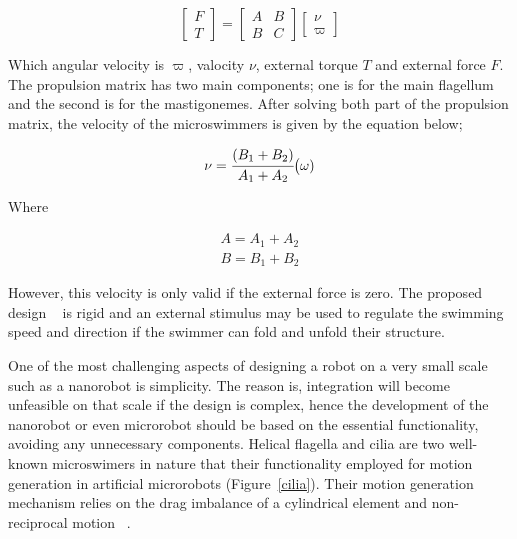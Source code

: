 \documentclass[a4paper,11pt]{article}
\begin{document}
\begin{sloppypar}
\[
\begin{bmatrix} F\\ 
T \end{bmatrix}  =\begin{bmatrix} A & B \\ 
B & C \end{bmatrix}  \begin{bmatrix} \nu
 \\ \varpi
\end{bmatrix}
\]

Which angular velocity is $\varpi$, valocity $\nu$, external torque $T$ and external force $F$.
The propulsion matrix has two main components; one is for the main flagellum and the second is for the mastigonemes. 
After solving both part of the propulsion matrix,
 the velocity of the microswimmers is given by the equation below;


\begin{equation}
  \nu = {\cfrac{(B_1 + B_2)}{A_1+A_2}} \big( \omega)
\end{equation} 

Where

\begin{equation}
\begin{split}
  A = A_1+A_2 \\
 B= B_1+B_2
\end{split}
\end{equation} 

However, this velocity is only valid if the external force is zero. The proposed 
design ~\citep{tottori2013artificial} is rigid and an external stimulus may be used to regulate the swimming
 speed and direction if the swimmer can fold and unfold their structure. 


One of the most challenging aspects of designing a robot on a very small scale such 
as a nanorobot is simplicity. The reason is, integration will become unfeasible on that
 scale if the design is complex, hence the development of the nanorobot or even microrobot
 should be based on the essential functionality, avoiding any unnecessary components. Helical 
flagella and cilia are two well-known microswimers in nature that their functionality employed for motion 
generation in artificial microrobots  (Figure~\ref{cilia}). Their motion generation mechanism relies on
 the drag imbalance of a cylindrical element and non-reciprocal motion ~\citep{gao2013bioinspired}. 




\end{sloppypar}
\end{document}
